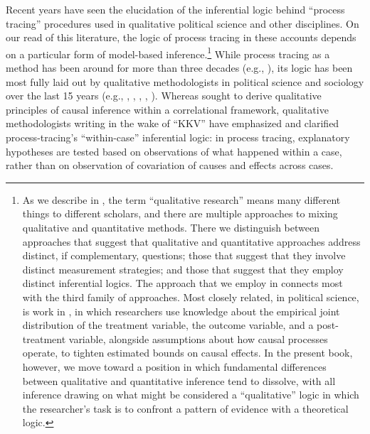 \documentclass[
  12pt,
]{book}
\begin{document}
Recent years have seen the elucidation of the inferential logic behind ``process tracing'' procedures used in qualitative political science and other disciplines. On our read of this literature, the logic of process tracing in these accounts depends on a particular form of model-based inference.\footnote{As we describe in \citet{humphreys2015mixing}, the term ``qualitative research'' means many different things to different scholars, and there are multiple approaches to mixing qualitative and quantitative methods. There we distinguish between approaches that suggest that qualitative and quantitative approaches address distinct, if complementary, questions; those that suggest that they involve distinct measurement strategies; and those that suggest that they employ distinct inferential logics. The approach that we employ in \citet{humphreys2015mixing} connects most with the third family of approaches. Most closely related, in political science, is work in \citet{GlynnQuinn2011}, in which researchers use knowledge about the empirical joint distribution of the treatment variable, the outcome variable, and a post-treatment variable, alongside assumptions about how causal processes operate, to tighten estimated bounds on causal effects. In the present book, however, we move toward a position in which fundamental differences between qualitative and quantitative inference tend to dissolve, with all inference drawing on what might be considered a ``qualitative'' logic in which the researcher's task is to confront a pattern of evidence with a theoretical logic.} While process tracing as a method has been around for more than three decades (e.g., \citet{george1985case}), its logic has been most fully laid out by qualitative methodologists in political science and sociology over the last 15 years (e.g., \citet{bennett2014process}, \citet{george2005case}, \citet{brady2010rethinking}, \citet{Hall2003aligning}, \citet{mahoney2010after}). Whereas \citet{king1994designing} sought to derive qualitative principles of causal inference within a correlational framework, qualitative methodologists writing in the wake of ``KKV'' have emphasized and clarified process-tracing's ``within-case'' inferential logic: in process tracing, explanatory hypotheses are tested based on observations of what happened within a case, rather than on observation of covariation of causes and effects across cases.
\end{document}
